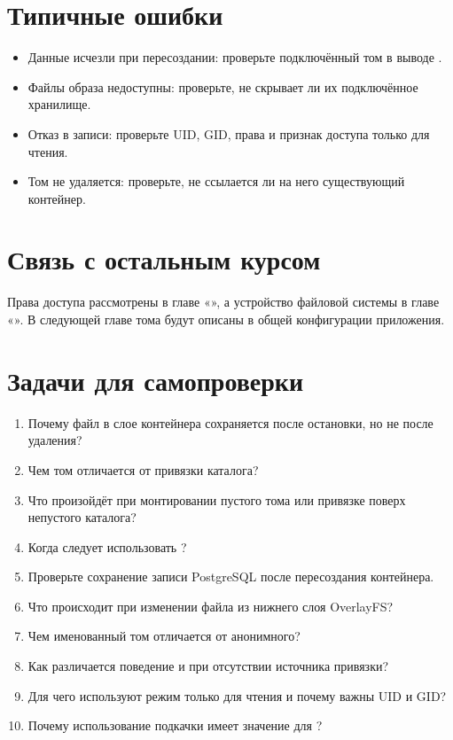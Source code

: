\begin{samepage}
\section{Типичные ошибки}
\begin{itemize}[nosep]
  \item Данные исчезли при пересоздании: проверьте подключённый том в выводе .
  \item Файлы образа недоступны: проверьте, не скрывает ли их подключённое хранилище.
  \item Отказ в записи: проверьте UID, GID, права и признак доступа только для чтения.
  \item Том не удаляется: проверьте, не ссылается ли на него существующий контейнер.
\end{itemize}

\section{Связь с остальным курсом}

Права доступа рассмотрены в главе «», а устройство файловой системы в главе «». В следующей главе тома будут описаны в общей конфигурации приложения.

\section{Задачи для самопроверки}
\begin{enumerate}[nosep]
  \item Почему файл в слое контейнера сохраняется после остановки, но не после удаления?
  \item Чем том отличается от привязки каталога?
  \item Что произойдёт при монтировании пустого тома или привязке поверх непустого каталога?
  \item Когда следует использовать ?
  \item Проверьте сохранение записи PostgreSQL после пересоздания контейнера.
  \item Что происходит при изменении файла из нижнего слоя OverlayFS?
  \item Чем именованный том отличается от анонимного?
  \item Как различается поведение  и  при отсутствии источника привязки?
  \item Для чего используют режим только для чтения и почему важны UID и GID?
  \item Почему использование подкачки имеет значение для ?
\end{enumerate}
\end{samepage}
\par
\clearpage
\endgroup